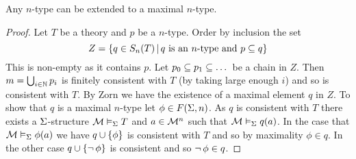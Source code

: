 \begin{prop}
    Any $n$-type can be extended to a maximal $n$-type.
\end{prop}
\begin{proof}
    Let $T$ be a theory and $p$ be a $n$-type.
    Order by inclusion the set
    \[ 
        Z = \left\{q \in S_n(T) \,|\, q \text{ is an } n\text{-type and }
        p \subseteq q\right\}
    \]
    This is non-empty as it contains $p$.
    Let $p_0 \subseteq p_1 \subseteq \dots$ be a chain in $Z$.
    Then $m = \bigcup_{i \in \mathbb{N}} p_i$ is finitely consistent with $T$
    (by taking large enough $i$)
    and so is consistent with $T$. 
    By Zorn we have the existence of a maximal element $q$ in $Z$.
    To show that $q$ is a maximal $n$-type let $\phi \in F(\Sigma,n)$. 
    As $q$ is consistent with $T$ there exists a $\Sigma$-structure 
    $\mathcal{M} \vDash_{\Sigma} T$ and $a \in {\mathcal{M}}^n$ such that 
    $\mathcal{M} \vDash_{\Sigma} q(a)$. 
    In the case that $\mathcal{M} \vDash_{\Sigma} \phi(a)$
    we have $q \cup \left\{\phi\right\}$ is consistent with $T$ and so by 
    maximality $\phi \in q$.
    In the other case $q \cup \left\{\neg\, \phi\right\}$ is consistent and so
    $\neg\, \phi \in q$.
\end{proof}

